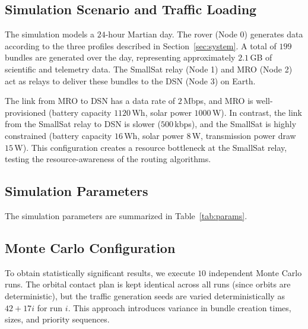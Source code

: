 \documentclass[journal,twocolumn]{IEEEtran}
\begin{document}
\subsection{Simulation Scenario and Traffic Loading}
The simulation models a $24$-hour Martian day. The rover (Node 0) generates data according to the three profiles described in Section~\ref{sec:system}. A total of $199$ bundles are generated over the day, representing approximately $2.1\,$GB of scientific and telemetry data. The SmallSat relay (Node 1) and MRO (Node 2) act as relays to deliver these bundles to the DSN (Node 3) on Earth. 

The link from MRO to DSN has a data rate of $2\,$Mbps, and MRO is well-provisioned (battery capacity $1120\,$Wh, solar power $1000\,$W). In contrast, the link from the SmallSat relay to DSN is slower ($500\,$kbps), and the SmallSat is highly constrained (battery capacity $16\,$Wh, solar power $8\,$W, transmission power draw $15\,$W). This configuration creates a resource bottleneck at the SmallSat relay, testing the resource-awareness of the routing algorithms.

\subsection{Simulation Parameters}
The simulation parameters are summarized in Table~\ref{tab:params}.



\subsection{Monte Carlo Configuration}
To obtain statistically significant results, we execute $10$ independent Monte Carlo runs. The orbital contact plan is kept identical across all runs (since orbits are deterministic), but the traffic generation seeds are varied deterministically as $42 + 17i$ for run $i$. This approach introduces variance in bundle creation times, sizes, and priority sequences.
\end{document}
